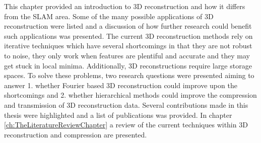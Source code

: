 This chapter provided an introduction to 3D reconstruction and how it differs from the SLAM area. Some of the many possible applications of 3D reconstruction were listed and a discussion of how further research could benefit such applications was presented. The current 3D reconstruction methods rely on iterative techniques which have several shortcomings in that they are not robust to noise, they only work when features are plentiful and accurate and they may get stuck in local minima. Additionally, 3D reconstructions require large storage spaces. To solve these problems, two research questions were presented aiming to answer 1. whether Fourier based 3D reconstruction could improve upon the shortcomings and 2. whether hierarchical methods could improve the compression and transmission of 3D reconstruction data. Several contributions made in this thesis were highlighted and a list of publications was provided. In chapter \ref{ch:TheLiteratureReviewChapter} a review of the current techniques within 3D reconstruction and compression are presented. \\




